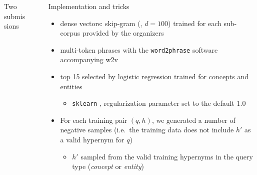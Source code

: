 \documentclass{beamer}
\newlength{\sepwid}
\newlength{\onecolwid}
\newcommand{\bull}[1]{
  \begin{itemize}
    \item #1
  \end{itemize}
}
\begin{document}
\begin{frame}[t]
\begin{columns}[t]
\begin{column}{\onecolwid}
\begin{block}{Two submissions}

  \end{block}


\end{column}

\begin{column}{\sepwid} %
\end{column}

\begin{column}{\onecolwid}



  \begin{block}{Implementation and tricks}
    \begin{itemize}
      \item \alert{dense vectors}: skip-gram (\citealt{Mikolov:2013f}, $d=100$) trained
        for each sub-corpus provided by the organizers 
      \item multi-token \alert{phrases} with the \texttt{word2phrase}
        software accompanying w2v
      \item top 15 selected by \alert{logistic regression} trained for concepts
        and entities 
        \bull{\texttt{sklearn}
        \citep{Pedregosa:2011},%
        regularization parameter set to the default $1.0$}

      \item For each training pair $(q,h)$, we generated a number of \alert{negative
        samples} (i.e.~the training data does not include $h'$ as a valid hypernym for
        $q$)
        \bull{$h'$ sampled from the valid training hypernyms in  the query type
        (\textit{concept} or \textit{entity})}


\end{itemize}
\end{block}
\end{column}
\end{columns}
\end{frame}
\end{document}
